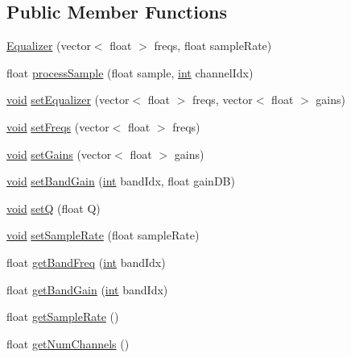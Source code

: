 \subsection*{Public Member Functions}
\begin{DoxyCompactItemize}
\item 
\hyperlink{class_audealize_1_1_equalizer_a551e481ffa4ac763c51b3fefa8db5a9d}{Equalizer} (vector$<$ float $>$ freqs, float sample\+Rate)
\item 
float \hyperlink{class_audealize_1_1_equalizer_a71cadea6dfac69d667ecda5046177a00}{process\+Sample} (float sample, \hyperlink{tk_8h_a83f82f76e7fed06f4c49d2db94028a6d}{int} channel\+Idx)
\item 
\hyperlink{tk_8h_aba408b7cd755a96426e004c015f5de8e}{void} \hyperlink{class_audealize_1_1_equalizer_a782dd682924a6d5d00a16407d35851ff}{set\+Equalizer} (vector$<$ float $>$ freqs, vector$<$ float $>$ gains)
\item 
\hyperlink{tk_8h_aba408b7cd755a96426e004c015f5de8e}{void} \hyperlink{class_audealize_1_1_equalizer_a32f93b1dd52f8fd2ea4445f024b2ab3a}{set\+Freqs} (vector$<$ float $>$ freqs)
\item 
\hyperlink{tk_8h_aba408b7cd755a96426e004c015f5de8e}{void} \hyperlink{class_audealize_1_1_equalizer_ab7105904dc9dad6ab49a6bf9aec82d18}{set\+Gains} (vector$<$ float $>$ gains)
\item 
\hyperlink{tk_8h_aba408b7cd755a96426e004c015f5de8e}{void} \hyperlink{class_audealize_1_1_equalizer_a281c8f1e77ed51241bf0e5103c47c848}{set\+Band\+Gain} (\hyperlink{tk_8h_a83f82f76e7fed06f4c49d2db94028a6d}{int} band\+Idx, float gain\+DB)
\item 
\hyperlink{tk_8h_aba408b7cd755a96426e004c015f5de8e}{void} \hyperlink{class_audealize_1_1_equalizer_a28d3bc5a80540ea5d0c7eae9089643ed}{setQ} (float Q)
\item 
\hyperlink{tk_8h_aba408b7cd755a96426e004c015f5de8e}{void} \hyperlink{class_audealize_1_1_equalizer_a8206b7f21b22f9c9f223014ab754c1b3}{set\+Sample\+Rate} (float sample\+Rate)
\item 
float \hyperlink{class_audealize_1_1_equalizer_ac73ade538a329b9ba112549b6194712c}{get\+Band\+Freq} (\hyperlink{tk_8h_a83f82f76e7fed06f4c49d2db94028a6d}{int} band\+Idx)
\item 
float \hyperlink{class_audealize_1_1_equalizer_a9a33b0c95b6da66e88e64b13fa1f55fb}{get\+Band\+Gain} (\hyperlink{tk_8h_a83f82f76e7fed06f4c49d2db94028a6d}{int} band\+Idx)
\item 
float \hyperlink{class_audealize_1_1_equalizer_a7878230c60e603ed49c978f07a5f0f5f}{get\+Sample\+Rate} ()
\item 
float \hyperlink{class_audealize_1_1_equalizer_aecd4b2b16d30b774ba573a17fa50592f}{get\+Num\+Channels} ()
\end{DoxyCompactItemize}
